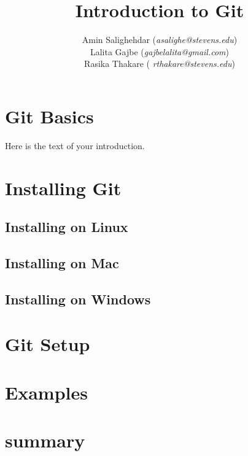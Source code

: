 \documentclass[a4paper,10pt]{article}
\begin{document}
\title{\textbf{Introduction to Git}}
\author{Amin Salighehdar (\textit{asalighe@stevens.edu})\\Lalita Gajbe (\textit{gajbelalita@gmail.com})\\ Rasika Thakare ( \textit{rthakare@stevens.edu}) }
\date{}
\maketitle

\section{Git Basics}
Here is the text of your introduction.

\section{Installing Git}
\subsection{Installing on Linux}
\subsection{Installing on Mac}
\subsection{Installing on Windows}
\section{Git Setup}
\section{Examples}
\section{summary}


\end{document}
